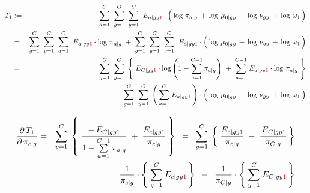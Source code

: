 \begin{eqnarray*}
T_{1}
&:=&
	\overset{C}{\underset{a=1}{\sum}}\;\;
	\overset{G}{\underset{g=1}{\sum}}\;\;
	\overset{C}{\underset{y=1}{\sum}}\;\;
	E_{a \vert gy{\color{red}1}}
	\cdot
	\left(\,
		\log\,\pi_{a \vert g}
		\,\overset{{\color{white}.}}{+}\,
		\log\,\mu_{0\vert gy}
		\,\overset{{\color{white}.}}{+}\,
		\log\,\nu_{gy}
		\,\overset{{\color{white}.}}{+}\,
		\log\,\omega_{1}
	\,\right)
\\
&=&
	\overset{G}{\underset{g=1}{\sum}}\;\;
	\overset{C}{\underset{y=1}{\sum}}\;\;
	\overset{C}{\underset{a=1}{\sum}}\;\;
	E_{a \vert gy{\color{red}1}} \cdot \log\,\pi_{a \vert g}
	\; + \;
	\overset{G}{\underset{g=1}{\sum}}\;\;
	\overset{C}{\underset{y=1}{\sum}}\;\;
	\overset{C}{\underset{c=1}{\sum}}\;\;
	E_{a \vert gy{\color{red}1}}
	\cdot
	\left(\,
		\log\,\mu_{0\vert gy}
		\,\overset{{\color{white}.}}{+}\,
		\log\,\nu_{gy}
		\,\overset{{\color{white}.}}{+}\,
		\log\,\omega_{1}
	\,\right)
\\
&=&
	{\color{white}+} \;\;
	\overset{G}{\underset{g=1}{\sum}}\;\;
	\overset{C}{\underset{y=1}{\sum}}\;
	\left\{\;
		E_{C \vert gy{\color{red}1}} \cdot \log\left(1 - \overset{C-1}{\underset{a=1}{\sum}}\,\pi_{a \vert g}\right)
		\; + \;
		\overset{C-1}{\underset{a=1}{\sum}}\;
		E_{a \vert gy{\color{red}1}} \cdot \log\,\pi_{a \vert g}
	\;\right\}
\\
&&
	+ \;\;
	\overset{G}{\underset{g=1}{\sum}}\;\;
	\overset{C}{\underset{y=1}{\sum}}\;
	\left(\,\overset{C}{\underset{a=1}{\sum}}\; E_{a \vert gy{\color{red}1}}\,\right)
	\cdot
	\left(\,
		\log\,\mu_{0\vert gy}
		\,\overset{{\color{white}.}}{+}\,
		\log\,\nu_{gy}
		\,\overset{{\color{white}.}}{+}\,
		\log\,\omega_{1}
	\,\right)
\end{eqnarray*}

\begin{eqnarray*}
\dfrac{\partial\,T_{1}}{\partial\,\pi_{c \vert g}}
&=&
	\overset{C}{\underset{y=1}{\sum}}\;
	\left\{\;
		\dfrac{-\,E_{C \vert gy{\color{red}1}}}{1 - \overset{C-1}{\underset{a=1}{\sum}}\,\pi_{a \vert g}}
		\; + \;
		\dfrac{E_{c \vert gy{\color{red}1}}}{\pi_{c \vert g}}
	\,\right\}
	\;\; = \;\;
	\overset{C}{\underset{y=1}{\sum}}\;
	\left\{\;
		\dfrac{E_{c \vert gy{\color{red}1}}}{\pi_{c \vert g}}
		\; - \;
		\dfrac{\,E_{C \vert gy{\color{red}1}}}{\pi_{C \vert g}}
	\,\right\}
\\
&=&
	\dfrac{1}{\pi_{c \vert g}}
	\cdot
	\left\{\;
		\overset{C}{\underset{y=1}{\sum}}\;
		E_{c \vert gy{\color{red}1}}
	\,\right\}
	\;\; - \;\;
	\dfrac{1}{\pi_{C \vert g}}
	\cdot
	\left\{\;
		\overset{C}{\underset{y=1}{\sum}}\;
		E_{C \vert gy{\color{red}1}}
	\,\right\}
\end{eqnarray*}


